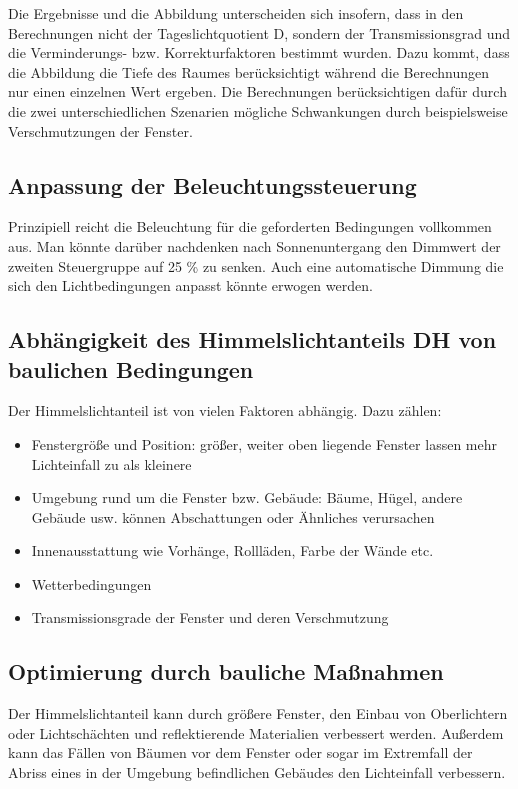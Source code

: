 Die Ergebnisse und die Abbildung unterscheiden sich insofern, dass in den Berechnungen nicht der Tageslichtquotient D, sondern der Transmissionsgrad und die Verminderungs- bzw. Korrekturfaktoren bestimmt wurden.
Dazu kommt, dass die Abbildung die Tiefe des Raumes berücksichtigt während die Berechnungen nur einen einzelnen Wert ergeben. 
Die Berechnungen berücksichtigen dafür durch die zwei unterschiedlichen Szenarien mögliche Schwankungen durch beispielsweise Verschmutzungen der Fenster.

\subsection{Anpassung der Beleuchtungssteuerung}

Prinzipiell reicht die Beleuchtung für die geforderten Bedingungen vollkommen aus.
Man könnte darüber nachdenken nach Sonnenuntergang den Dimmwert der zweiten Steuergruppe auf 25 \% zu senken. Auch eine automatische Dimmung die sich den Lichtbedingungen anpasst könnte erwogen werden.
\newpage
\subsection{ Abhängigkeit des Himmelslichtanteils DH von baulichen Bedingungen}

Der Himmelslichtanteil ist von vielen Faktoren abhängig. Dazu zählen:
\begin{itemize}
\item Fenstergröße und Position: größer, weiter oben liegende Fenster lassen mehr Lichteinfall zu als kleinere
\item Umgebung rund um die Fenster bzw. Gebäude: Bäume, Hügel, andere Gebäude usw. können Abschattungen oder Ähnliches verursachen
\item Innenausstattung wie Vorhänge, Rollläden, Farbe der Wände etc. 
\item Wetterbedingungen
\item Transmissionsgrade der Fenster und deren Verschmutzung

\end{itemize}

\subsection{Optimierung durch bauliche Maßnahmen}
Der Himmelslichtanteil kann durch größere Fenster, den Einbau von Oberlichtern oder Lichtschächten und reflektierende Materialien verbessert werden. Außerdem kann das Fällen von Bäumen vor dem Fenster oder sogar im Extremfall der Abriss eines in der Umgebung befindlichen Gebäudes den Lichteinfall verbessern.

